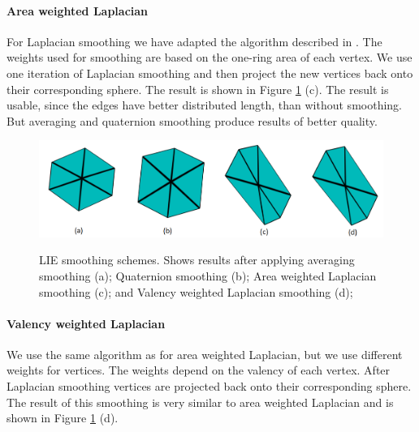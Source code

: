\paragraph{Area weighted Laplacian}
For Laplacian smoothing we have adapted the algorithm described in \cite{laplac_phd}. The weights used for smoothing are based on the one-ring area of each vertex. We use one iteration of Laplacian smoothing and then project the new vertices back onto their corresponding sphere. The result is shown in Figure \ref{fig:smoothing_ilu} (c). The result is usable, since the edges have better distributed length, than without smoothing. But averaging and quaternion smoothing produce results of better quality.

\begin{figure}[h]
    \centering
    \includegraphics[width=\textwidth]{images/smoothing_ilu.png}
    \label{fig:smoothing_ilu}
    \caption[LIE smoothing schemes]{LIE smoothing schemes. Shows results after applying averaging smoothing (a); Quaternion smoothing (b); Area weighted Laplacian smoothing (c); and Valency weighted Laplacian smoothing (d);}
\end{figure}

\paragraph{Valency weighted Laplacian}
We use the same algorithm as for area weighted Laplacian, but we use different weights for vertices. The weights depend on the valency of each vertex. After Laplacian smoothing vertices are projected back onto their corresponding sphere. The result of this smoothing is very similar to area weighted Laplacian and is shown in Figure \ref{fig:smoothing_ilu} (d).

